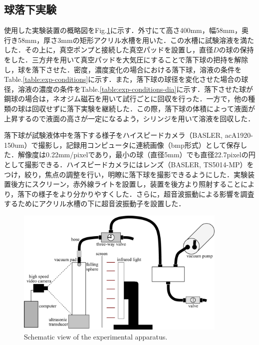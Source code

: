 \newpage

\subsection{球落下実験}

使用した実験装置の概略図をFig.\ref{fig:device}に示す．外寸にて高さ400mm，幅58mm，奥行き58mm，厚さ3mmの矩形アクリル水槽を用いた．この水槽に試験溶液を満たした．その上に，真空ポンプと接続した真空パッドを設置し，直径$D$の球の保持をした．三方弁を用いて真空パッドを大気圧にすることで落下球の把持を解除し，球を落下させた．密度，濃度変化の場合における落下球，溶液の条件をTable.\ref{table:exp-conditions}に示す．また，落下球の球径を変化させた場合の球径，溶液の濃度の条件をTable.\ref{table:exp-conditions-dia}に示す．落下させた球が鋼球の場合は，ネオジム磁石を用いて試行ごとに回収を行った．一方で，他の種類の球は回収せずに落下実験を継続した．この際，落下球の体積によって液面が上昇するので液面の高さが一定になるよう，シリンジを用いて溶液を回収した．

落下球が試験液体中を落下する様子をハイスピードカメラ（BASLER, acA1920-150um）で撮影し，記録用コンピュータに連続画像（bmp形式）として保存した．解像度は0.22mm/pixelであり，最小の球（直径5mm）でも直径22.7pixelの円として撮影できる．ハイスピードカメラにはレンズ（BASLER, TS5014-MP）をつけ，絞り，焦点の調整を行い，明瞭に落下球を撮影できるようにした．実験装置後方にスクリーン，赤外線ライトを設置し，装置を後方より照射することにより，落下の様子をより分かりやすくした．さらに，超音波振動による影響を調査するためにアクリル水槽の下に超音波振動子を設置した．

\begin{figure}[h]
    \centering
    \includegraphics[width=0.9\textwidth]{2-Methods/device-vacuum.eps}
    \caption{Schematic view of the experimental apparatus.}
    \label{fig:device}
\end{figure}

